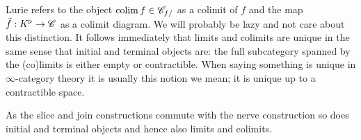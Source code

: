 \documentclass[../../thesis.tex]{subfiles}
\begin{document}
Lurie \cite{HTT} refers to the object $\operatorname{colim} f \in \mathscr{C}_{f/}$ as a colimit of $f$ and the map $\bar{f}: K^{\triangleright} \to \mathscr{C}$ as a colimit diagram.
We will probably be lazy and not care about this distinction.
It follows immediately that limits and colimits are unique in the same sense that initial and terminal objects are: the full subcategory spanned by the (co)limits is either empty or contractible.
When saying something is unique in $\infty$-category theory it is usually this notion we mean; it is unique up to a contractible space.
\begin{remark}
    As the slice and join constructions commute with the nerve construction so does initial and terminal objects and hence also limits and colimits.
\end{remark}
\end{document}
